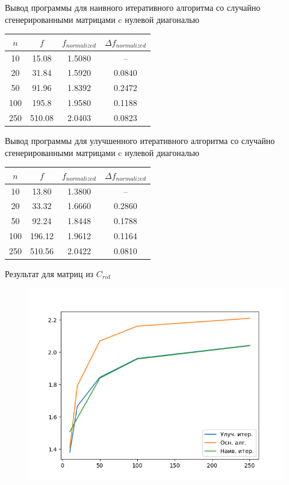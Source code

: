 \documentclass[12pt]{beamer}
\begin{document}
\begin{frame}{Вывод программы для наивного итеративного алгоритма со случайно сгенерированными матрицами c нулевой диагональю}
\begin{tabular}{|c|c|c|c|}
\hline $n$ & $f$ & $f_{normalized}$ & $\Delta f_{normalized}$ \\
\hline 10 & 15.08 & 1.5080 & -- \\
\hline 20 & 31.84 & 1.5920 & 0.0840 \\
\hline 50 & 91.96 & 1.8392 & 0.2472 \\
\hline 100 & 195.8 & 1.9580 & 0.1188 \\
\hline 250 & 510.08 & 2.0403 & 0.0823 \\
\hline
\end{tabular}
\end{frame}

\begin{frame}{Вывод программы для улучшенного итеративного алгоритма со случайно сгенерированными матрицами c нулевой диагональю}
\begin{tabular}{|c|c|c|c|}
\hline $n$ & $f$ & $f_{normalized}$ & $\Delta f_{normalized}$ \\
\hline 10 & 13.80 & 1.3800 & -- \\
\hline 20 & 33.32 & 1.6660 & 0.2860 \\
\hline 50 & 92.24 & 1.8448 & 0.1788 \\
\hline 100 & 196.12 & 1.9612 & 0.1164 \\
\hline 250 & 510.56 & 2.0422 & 0.0810 \\	
\hline
\end{tabular}
\end{frame}

\begin{frame}{Результат для матриц из $C_{rid}$}
\begin{figure}
\includegraphics[scale=0.5]{randz.png}
\end{figure}
\end{frame}
\end{document}
